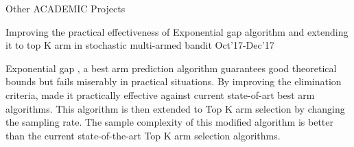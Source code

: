 \documentclass{resume} %
\begin{document}
\vspace*{-1.5mm}
\begin{rSection}{Other ACADEMIC Projects}

\begin{rSubsection}{ Improving the practical effectiveness of Exponential gap algorithm and extending it to top K arm in stochastic multi-armed bandit }{Oct'17-Dec'17}{}{}
\item Exponential gap , a best arm prediction algorithm guarantees good theoretical bounds but fails miserably in practical situations. By improving the elimination criteria, made it practically effective against current state-of-art best arm algorithms.  This algorithm is then extended to Top K arm selection by changing the sampling rate. The sample complexity of this modified algorithm is better than the current state-of-the-art Top K arm selection algorithms.
\end{rSubsection}
\vspace*{-3mm}



\end{rSection}
\end{document}
